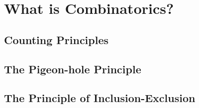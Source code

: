 %
%
% 


\chapter{What is Combinatorics?}












\section{Counting Principles}



\section{The Pigeon-hole Principle}



\section{The Principle of Inclusion-Exclusion}



\endinput

